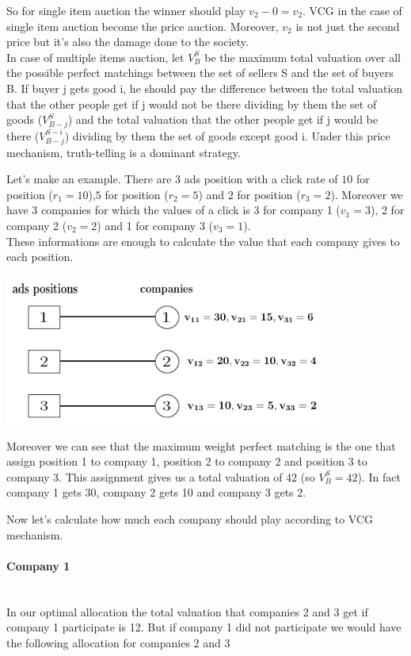\documentclass{article}
\begin{document}
So for single item auction the winner should play $v_2-0=v_2$. VCG in the case of single item auction become the  price auction. Moreover, $v_2$ is not just the second price but it's also the damage done to the society.\\
In case of multiple items auction, let $V_{B}^{S}$ be the maximum total valuation over all the possible perfect matchings between the set of sellers S and the set of buyers B. If buyer j gets good i, he should pay the difference between the total valuation that the other people get if j would not be there dividing by them the set of goods ($V_{B-j}^{S}$) and the total valuation that the other people get if j would be there ($V_{B-j}^{S-i}$) dividing by them the set of goods except good i. Under this price mechanism, truth-telling is a dominant strategy.

Let's make an example. There are 3 ads position with a click rate of $10$ for  position ($r_1=10$),$5$ for  position ($r_2=5$) and $2$ for  position ($r_3=2$). Moreover we have 3 companies for which the values of a click is 3 for company 1 ($v_1=3$), 2 for company 2 ($v_2=2$) and 1 for company 3 ($v_3=1$).\\
These informations are enough to calculate the value that each company gives to each position.

\centerline{
\includegraphics[width=300pt]{img15.jpg}}

Moreover we can see that the maximum weight perfect matching is the one that assign position 1 to company 1, position 2 to company 2 and position 3 to company 3. This assignment gives us a total valuation of $42$ (so $V_{B}^{S}=42$). In fact company 1 gets 30, company 2 gets 10 and company 3 gets 2. 

Now let's calculate how much each company should play according to VCG mechanism. 
\paragraph{Company 1} \mbox{}\\
In our optimal allocation the total valuation that companies 2 and 3 get if company 1 participate is 12. But if company 1 did not participate we would have the following allocation for companies 2 and 3
\end{document}
